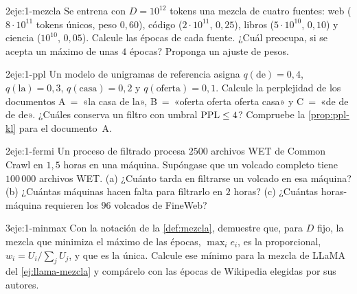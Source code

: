 \begin{ejercicio}{2}{eje:1-mezcla}
Se entrena con $D=10^{12}$ tokens una mezcla de cuatro fuentes: web ($8\cdot 10^{11}$ tokens únicos, peso $0{,}60$), código ($2\cdot 10^{11}$, $0{,}25$), libros ($5\cdot 10^{10}$, $0{,}10$) y ciencia ($10^{10}$, $0{,}05$). Calcule las épocas de cada fuente. ¿Cuál preocupa, si se acepta un máximo de unas $4$ épocas? Proponga un ajuste de pesos.
\end{ejercicio}

\begin{ejercicio}{2}{eje:1-ppl}
Un modelo de unigramas de referencia asigna $q(\text{de})=0{,}4$, $q(\text{la})=0{,}3$, $q(\text{casa})=0{,}2$ y $q(\text{oferta})=0{,}1$. Calcule la perplejidad de los documentos A~=~«la casa de la», B~=~«oferta oferta oferta casa» y C~=~«de de de de». ¿Cuáles conserva un filtro con umbral $\operatorname{PPL}\le 4$? Compruebe la \cref{prop:ppl-kl} para el documento~A.
\end{ejercicio}

\begin{ejercicio}{2}{eje:1-fermi}
Un proceso de filtrado procesa $2500$ archivos WET de Common Crawl en $1{,}5$ horas en una máquina. Supóngase que un volcado completo tiene $100\,000$ archivos WET. (a) ¿Cuánto tarda en filtrarse un volcado en esa máquina? (b) ¿Cuántas máquinas hacen falta para filtrarlo en $2$ horas? (c) ¿Cuántas horas-máquina requieren los $96$ volcados de FineWeb?
\end{ejercicio}

\begin{ejercicio}{3}{eje:1-minmax}
Con la notación de la \cref{def:mezcla}, demuestre que, para $D$ fijo, la mezcla que minimiza el máximo de las épocas, $\max_ie_i$, es la proporcional, $w_i=U_i/\sum_jU_j$, y que es la única. Calcule ese mínimo para la mezcla de LLaMA del \cref{ej:llama-mezcla} y compárelo con las épocas de Wikipedia elegidas por sus autores.
\end{ejercicio}
